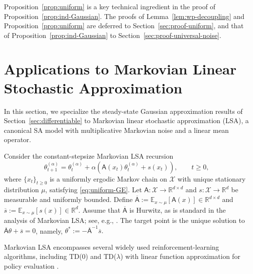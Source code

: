 \documentclass[11pt,letterpaper]{article}
\theoremstyle{plain}
\theoremstyle{definition}
\theoremstyle{remark}
\newcommand{\E}{\mathbb{E}}
\newcommand{\R}{\mathbb{R}}
\begin{document}
Proposition~\ref{prop:uniform} is a key technical ingredient in the proof of
Proposition~\ref{prop:ind-Gaussian}.  The proofs of
Lemma~\ref{lem:wp-decoupling} and Proposition~\ref{prop:uniform} are deferred
to Section~\ref{sec:proof-uniform}, and that of
Proposition~\ref{prop:ind-Gaussian} to
Section~\ref{sec:proof-universal-noise}.


\section{Applications to Markovian Linear Stochastic Approximation}
\label{sec:linearSA}
In this section, we specialize the steady-state Gaussian approximation results
of Section~\ref{sec:differentiable} to Markovian linear stochastic
approximation (LSA), a canonical SA model with multiplicative Markovian noise
and a linear mean operator.


Consider the constant-stepsize Markovian LSA recursion \cite{srikant2019finite}
\begin{equation}
\label{eq:update-LSA}
    \theta_{t+1}^{(\alpha)}
    =
    \theta_t^{(\alpha)}
    +
    \alpha\left(
        \mathsf A(x_t)\theta_t^{(\alpha)}
        +
        s(x_t)
    \right),
    \qquad t\geq0,
\end{equation}
where  \(\{x_t\}_{t\geq0}\) is a uniformly ergodic Markov chain on
\(\mathcal X\) with unique stationary distribution \(\mu\), satisfying
\eqref{eq:uniform-GE}. Let \(\mathsf A:\mathcal X\to\R^{d\times d}\) and \(s:\mathcal X\to\R^d\) be measurable and uniformly bounded. Define $\overline{\mathsf A}
    :=
    \E_{x\sim\mu}[\mathsf A(x)]
    \in\R^{d\times d}$ and $
    \overline s
    :=
    \E_{x\sim\mu}[s(x)]
    \in\R^d.$ Assume that \(\overline{\mathsf A}\) is Hurwitz, as is standard in the analysis of Markovian LSA; see, e.g., \cite{srikant2019finite,huo2023bias,durmus2025finite}. The target point is the unique solution to \(\overline{\mathsf A}\theta+\overline s=0\), namely, $\theta^* := -\overline{\mathsf A}^{-1}\overline s. $ 
    
Markovian LSA encompasses several widely used reinforcement-learning
algorithms, including TD(0) and TD(\(\lambda\)) with linear function
approximation for policy evaluation
\cite{tsitsiklis1996analysis,bhandari2021finite,srikant2019finite,mou2021optimal}.
\end{document}
